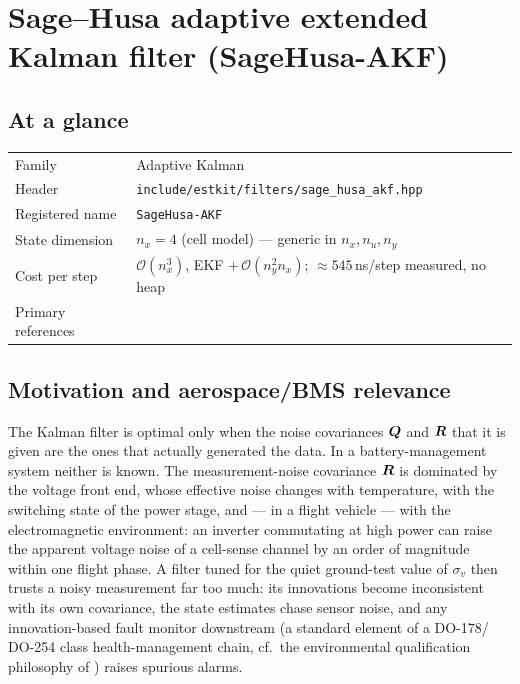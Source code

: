 \chapter{Sage--Husa adaptive extended Kalman filter (SageHusa-AKF)}
\label{ch:sagehusaakf}

\section*{At a glance}
\begin{tabular}{@{}l>{\raggedright\arraybackslash}p{}@{}}
Family & Adaptive Kalman \\
Header & \texttt{include/estkit/filters/sage\_husa\_akf.hpp} \\
Registered name & \texttt{SageHusa-AKF} \\
State dimension & $n_x = 4$ (cell model) --- generic in $n_x, n_u, n_y$ \\
Cost per step & $\mathcal{O}(n_x^3)$, EKF $+\,\mathcal{O}(n_y^2 n_x)$; $\approx 545$\,ns/step measured, no heap \\
Primary references & \cite{sagehusa1969,sagemelsa1971,maybeck1979,jazwinski1970} \\
\end{tabular}

\section{Motivation and aerospace/BMS relevance}
The Kalman filter is optimal only when the noise covariances $\bm{Q}$ and $\bm{R}$ that it is given are
the ones that actually generated the data.  In a battery-management system neither is known.  The
measurement-noise covariance $\bm{R}$ is dominated by the voltage front end, whose effective noise
changes with temperature, with the switching state of the power stage, and --- in a flight vehicle
--- with the electromagnetic environment: an inverter commutating at high power can raise the
apparent voltage noise of a cell-sense channel by an order of magnitude within one flight phase.
A filter tuned for the quiet ground-test value of $\sigma_v$ then trusts a noisy measurement far
too much: its innovations become inconsistent with its own covariance, the state estimates chase
sensor noise, and any innovation-based fault monitor downstream (a standard element of a DO-178/
DO-254 class health-management chain, cf.\ the environmental qualification philosophy of
\cite{rtca2017do311a}) raises spurious alarms.

